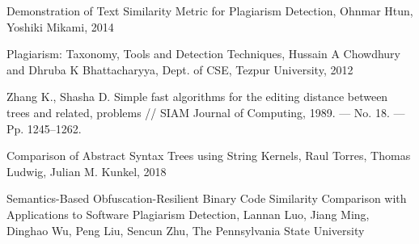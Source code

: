 \begin{thebibliography}{}
	Demonstration of Text Similarity Metric for Plagiarism Detection,
	Ohnmar Htun, Yoshiki Mikami,
	2014
	
	Plagiarism: Taxonomy, Tools and Detection Techniques,
	Hussain A Chowdhury and Dhruba K Bhattacharyya,
	Dept. of CSE, Tezpur University,
	2012
	
	Zhang K., Shasha D. Simple fast algorithms for the editing distance between trees and related,
	problems // SIAM Journal of Computing, 1989. — No. 18. — Pp. 1245–1262.
	
	Comparison of Abstract Syntax Trees using String Kernels,
	Raul Torres, Thomas Ludwig, Julian M. Kunkel,
	2018

	Semantics-Based Obfuscation-Resilient Binary Code
	Similarity Comparison with Applications to Software
	Plagiarism Detection,
	Lannan Luo, Jiang Ming, Dinghao Wu, Peng Liu, Sencun Zhu,
	The Pennsylvania State University
	
	
\end{thebibliography}
\endgroup

\pagebreak